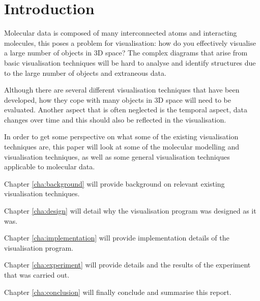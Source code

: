 \chapter{Introduction}
\label{cha:introduction}

Molecular data is composed of many interconnected atoms and interacting
molecules, this poses a problem for visualisation: how do you effectively
visualise a large number of objects in 3D space? The complex diagrams that arise
from basic visualisation techniques will be hard to analyse and identify
structures due to the large number of objects and extraneous data.

Although there are several different visualisation techniques that have been
developed, how they cope with many objects in 3D space will need to be
evaluated. Another aspect that is often neglected is the temporal aspect, data
changes over time and this should also be reflected in the visualisation.

In order to get some perspective on what some of the existing visualisation
techniques are, this paper will look at some of the molecular modelling and
visualisation techniques, as well as some general visualisation techniques
applicable to molecular data.

Chapter \ref{cha:background} will provide background on relevant existing
visualisation techniques.

Chapter \ref{cha:design} will detail why the visualisation program was designed
as it was.

Chapter \ref{cha:implementation} will provide implementation details of the
visualisation program.

Chapter \ref{cha:experiment} will provide details and the results of the
experiment that was carried out.

Chapter \ref{cha:conclusion} will finally conclude and summarise this report.


